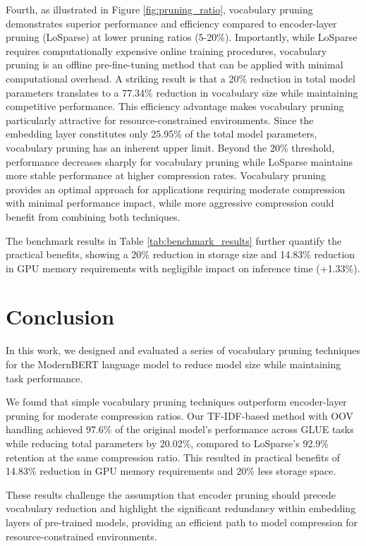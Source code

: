 \documentclass[twocolumn]{article}
\begin{document}
Fourth, as illustrated in Figure \ref{fig:pruning_ratio}, vocabulary pruning demonstrates superior performance and efficiency compared to encoder-layer pruning (LoSparse) at lower pruning ratios (5-20\%). Importantly, while LoSparse requires computationally expensive online training procedures, vocabulary pruning is an offline pre-fine-tuning method that can be applied with minimal computational overhead. A striking result is that a 20\% reduction in total model parameters translates to a 77.34\% reduction in vocabulary size while maintaining competitive performance. This efficiency advantage makes vocabulary pruning particularly attractive for resource-constrained environments. Since the embedding layer constitutes only 25.95\% of the total model parameters, vocabulary pruning has an inherent upper limit. Beyond the 20\% threshold, performance decreases sharply for vocabulary pruning while LoSparse maintains more stable performance at higher compression rates. Vocabulary pruning provides an optimal approach for applications requiring moderate compression with minimal performance impact, while more aggressive compression could benefit from combining both techniques.

The benchmark results in Table \ref{tab:benchmark_results} further quantify the practical benefits, showing a 20\% reduction in storage size and 14.83\% reduction in GPU memory requirements with negligible impact on inference time (+1.33\%).



\section{Conclusion}
In this work, we designed and evaluated a series of vocabulary pruning techniques for the ModernBERT language model to reduce model size while maintaining task performance.

We found that simple vocabulary pruning techniques outperform encoder-layer pruning for moderate compression ratios. Our TF-IDF-based method with OOV handling achieved 97.6\% of the original model's performance across GLUE tasks while reducing total parameters by 20.02\%, compared to LoSparse's 92.9\% retention at the same compression ratio. This resulted in practical benefits of 14.83\% reduction in GPU memory requirements and 20\% less storage space.

These results challenge the assumption that encoder pruning should precede vocabulary reduction and highlight the significant redundancy within embedding layers of pre-trained models, providing an efficient path to model compression for resource-constrained environments.
\end{document}
